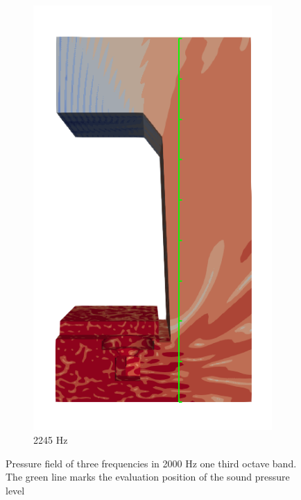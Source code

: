 \begin{figure}[H]
\begin{subfigure}[b]{0.3\textwidth}
		\includegraphics[width=\linewidth]{fig/chap5/freq_steps/field_result_2245Hz.png}
		\caption{2245 Hz}
	\end{subfigure}
	\caption{Pressure field of three frequencies in 2000 Hz one third octave band. The green line marks the evaluation position of the sound pressure level}
	\label{fig:pressure_field_solution}
\end{figure}

